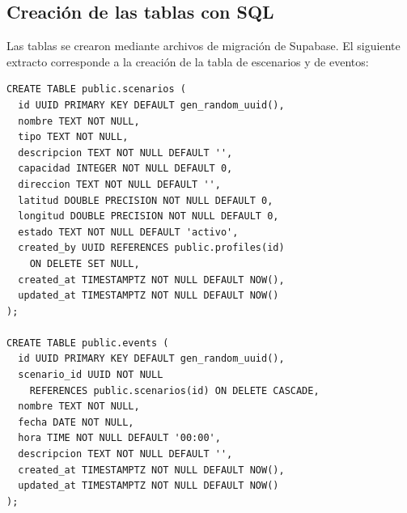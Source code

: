 \begin{figure}[H]
\centering
\end{figure}

\subsection{Creaci\'on de las tablas con SQL}

Las tablas se crearon mediante archivos de migraci\'on de Supabase. El
siguiente extracto corresponde a la creaci\'on de la tabla de escenarios
y de eventos:

\begin{lstlisting}
CREATE TABLE public.scenarios (
  id UUID PRIMARY KEY DEFAULT gen_random_uuid(),
  nombre TEXT NOT NULL,
  tipo TEXT NOT NULL,
  descripcion TEXT NOT NULL DEFAULT '',
  capacidad INTEGER NOT NULL DEFAULT 0,
  direccion TEXT NOT NULL DEFAULT '',
  latitud DOUBLE PRECISION NOT NULL DEFAULT 0,
  longitud DOUBLE PRECISION NOT NULL DEFAULT 0,
  estado TEXT NOT NULL DEFAULT 'activo',
  created_by UUID REFERENCES public.profiles(id)
    ON DELETE SET NULL,
  created_at TIMESTAMPTZ NOT NULL DEFAULT NOW(),
  updated_at TIMESTAMPTZ NOT NULL DEFAULT NOW()
);

CREATE TABLE public.events (
  id UUID PRIMARY KEY DEFAULT gen_random_uuid(),
  scenario_id UUID NOT NULL
    REFERENCES public.scenarios(id) ON DELETE CASCADE,
  nombre TEXT NOT NULL,
  fecha DATE NOT NULL,
  hora TIME NOT NULL DEFAULT '00:00',
  descripcion TEXT NOT NULL DEFAULT '',
  created_at TIMESTAMPTZ NOT NULL DEFAULT NOW(),
  updated_at TIMESTAMPTZ NOT NULL DEFAULT NOW()
);
\end{lstlisting}

